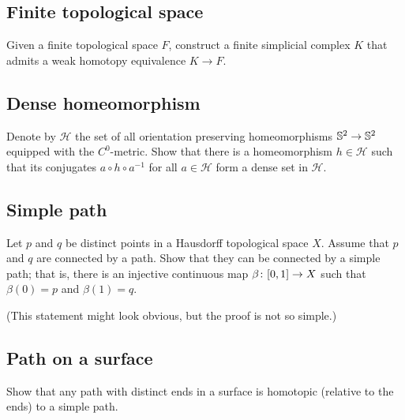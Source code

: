 \subsection*{Finite topological space\easy}\label{Finite topological space}


\begin{pr}
Given a finite topological space $F$, 
construct a finite simplicial complex $K$
that admits a weak homotopy equivalence  $K\to F$. 
\end{pr}

\subsection*{Dense homeomorphism\easy}\label{Dense homeomorphism}

\begin{pr}
Denote by $\mathcal{H}$ the set of all orientation preserving homeomorphisms $\mathbb {S}^2\z\to\mathbb {S}^2$
equipped with the $C^0$-metric.
Show that there is a homeomorphism $h\in \mathcal{H}$ such that its conjugates $a\circ h\circ a^{-1}$ for all $a\in\mathcal{H}$ form a dense set in $\mathcal{H}$.
 
\end{pr}

\subsection*{Simple path\easy}
\label{Simple path}

\begin{pr}
Let $p$ and $q$ be distinct points in a Hausdorff topological space $X$.
Assume that $p$ and $q$ are connected by a path.
Show that they can be connected by a simple path;
that is, there is an injective continuous map $\beta\:[0,1]\z\to X$
such that $\beta(0)=p$ and $\beta(1)=q$.
\end{pr}

(This statement might look obvious, but the proof is not so simple.)

\subsection*{Path on a surface\easy}
\label{Path on a surface}

\begin{pr}
Show that any path with distinct ends in a surface is homotopic (relative to the ends) to a simple path.  
\end{pr}






